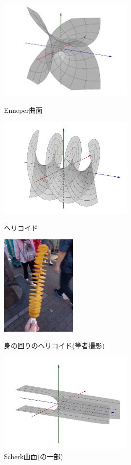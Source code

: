 \documentclass[a4j]{ltjsarticle}
\numberwithin{equation}{section}
\theoremstyle{definition}
\begin{document}
\begin{figure}[htbp]
    \begin{minipage}{0.45\linewidth}
      \centering
      \includegraphics[height=50mm]{enneper.png}
      \caption{Enneper曲面}
      \label{pic:enneper}
    \end{minipage}
    \begin{minipage}{0.45\linewidth}
        \centering
        \includegraphics[height=50mm]{helycoid.png}
        \caption{ヘリコイド}
        \label{pic:helycoid}
      \end{minipage}
      \begin{minipage}{0.45\linewidth}
        \centering
        \includegraphics[height=50mm]{twistpotato.jpg}
        \caption{身の回りのヘリコイド(筆者撮影)}
        \label{pic:twistpotato}
      \end{minipage}
      \begin{minipage}{0.45\linewidth}
        \centering
        \includegraphics[height=50mm]{scherk.png}
        \caption{Scherk曲面(の一部)}
        \label{pic:scherk}
      \end{minipage}    
\end{figure}
\end{document}
